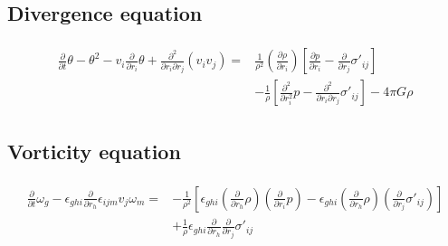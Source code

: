 \documentclass[a4paper,
					12pt,
					twoside,
					openright
					]{book}
\newcommand{\lra}[1]{{ \left( #1 \right) }}
\newcommand{\lrb}[1]{{ \left[ #1 \right] }}
\newcommand{\pd}[1]{\frac{\partial}{\partial #1}}
\newcommand{\ppd}[2]{\frac{\partial #2}{\partial #1}}
\newcommand{\pdd}[1]{\frac{\partial^2}{\partial #1^2}}
\begin{document}
\subsection*{Divergence equation}
\begin{align}
\begin{split}
\pd{t}\theta-\theta^2-v_i\pd{r_i}\theta
+\frac{\partial^2}{\partial r_i \partial r_j}(v_i v_j) =&
\frac{1}{\rho^2}\lra{\ppd{r_i}{\rho}}
\lrb{\ppd{r_i}{p}-\pd{r_j}\sigma'_{ij}}\\
&-\frac{1}{\rho}\lrb{\pdd{r_i}p
-\frac{\partial^2}{\partial r_i \partial r_j}\sigma'_{ij}}
-4\pi G \rho
\end{split}
\label{eq:div}
\end{align}

\subsection*{Vorticity equation}
\begin{align}
\begin{split}
\pd{t}\omega_g
-\epsilon_{ghi}\pd{r_h} \epsilon_{ijm} v_j \omega_m =
&-\frac{1}{\rho^2}\lrb{
\epsilon_{ghi} \lra{\pd{r_h}\rho} \lra{\pd{r_i}p}
-\epsilon_{ghi} \lra{\pd{r_h}\rho} \lra{\pd{r_j}\sigma'_{ij}}}\\
&+\frac{1}{\rho}\epsilon_{ghi}\pd{r_h}\pd{r_j}\sigma'_{ij}
\end{split}
\label{eq:vort}
\end{align}
\end{document}
